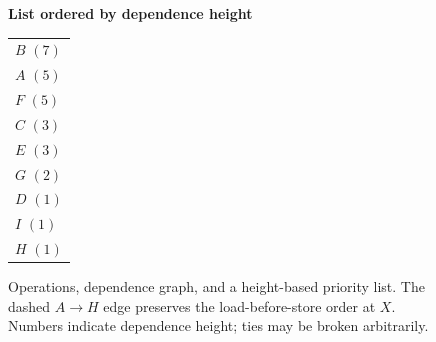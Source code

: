 \begin{figure}[t]
\begin{minipage}[t]{0.45\textwidth}
    \end{minipage}\hfill
    \begin{minipage}[t]{0.20\textwidth}
        \raggedright
        \textbf{List ordered by dependence height}\par
        \vspace{0.5ex}
        \begin{tabular}[t]{@{}l@{}}
            $B$ $(7)$ \\
            $A$ $(5)$ \\
            $F$ $(5)$ \\
            $C$ $(3)$ \\
            $E$ $(3)$ \\
            $G$ $(2)$ \\
            $D$ $(1)$ \\
            $I$ $(1)$ \\
            $H$ $(1)$
        \end{tabular}
    \end{minipage}
    \caption{Operations, dependence graph, and a height-based priority list. The dashed $A\rightarrow H$ edge preserves the load-before-store order at $X$. Numbers indicate dependence height; ties may be broken arbitrarily.}
    \label{fig:ilp-vliw-ddg}
\end{figure}

